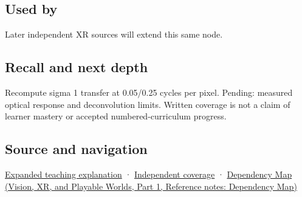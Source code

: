 \subsection{Used by}\label{appendix-8b76b0efd27f-used-by}

\hypertarget{appendix-8b76b0efd27f-used-by}{}

Later independent XR sources will extend this same node.

\subsection{Recall and next depth}\label{appendix-8b76b0efd27f-recall-and-next-depth}

\hypertarget{appendix-8b76b0efd27f-recall-and-next-depth}{}

Recompute sigma 1 transfer at 0.05/0.25 cycles per pixel. Pending: measured optical response and deconvolution limits. Written coverage is not a claim of learner mastery or accepted numbered-curriculum progress.

\subsection{Source and navigation}\label{appendix-8b76b0efd27f-source-and-navigation}

\hypertarget{appendix-8b76b0efd27f-source-and-navigation}{}

\hyperref[04-visual-computing-ii-ch042-a-footprint-is-more-meaningful-than-an-isolated-pixel-center]{Expanded teaching explanation} · \hyperref[appendix-fd090d982a15-xr01---independent-seeing-and-representation-source]{Independent coverage} · \href{../07-Vision-XR-and-Playable-Worlds-P01/main.pdf\#nameddest=appendix-4ad47bdd269a}{Dependency Map (Vision, XR, and Playable Worlds, Part 1, Reference notes: Dependency Map)}
